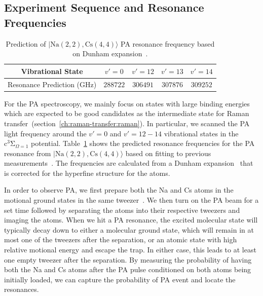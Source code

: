 \subsection{Experiment Sequence and Resonance Frequencies}
\label{ch:pa:sequence-res}

\begin{table}
  \centering
  \caption[PA resonance prediction]{
    Prediction of $|\mathrm{Na(2, 2),Cs(4, 4)}\rangle$ PA resonance frequency
    based on Dunham expansion~\cite{grochola_spin-forbidden_2011,dunham_energy_1932}.
    \label{table:pa:theory-prediction}}
  \begin{tabular}{|c|c|c|c|c|}
    \hline
    Vibrational State&$v'=0$&$v'=12$&$v'=13$&$v'=14$\\\hline
    Resonance Prediction (GHz)&$288722$&$306491$&$307876$&$309252$\\\hline
  \end{tabular}
\end{table}

For the PA spectroscopy, we mainly focus on states with large binding energies
which are expected to be good candidates as the intermediate state
for Raman transfer~(section~\ref{ch:raman-transfer:raman}).
In particular, we scanned the PA light frequency around the $v'=0$ and $v'=12-14$
vibrational states in the $\mathrm{c^3\Sigma}_{\Omega=1}$ potential.
Table~\ref{table:pa:theory-prediction} shows the predicted resonance frequencies
for the PA resonance from $|\mathrm{Na(2, 2),Cs(4, 4)}\rangle$
based on fitting to previous measurements~\cite{grochola_spin-forbidden_2011}.
The frequencies are calculated from a Dunham expansion~\cite{dunham_energy_1932}
that is corrected for the hyperfine structure for the atoms.

In order to observe PA, we first prepare both the Na and Cs atoms in the motional ground states
in the same tweezer~\cite{liu_building_2018}.
We then turn on the PA beam for a set time
followed by separating the atoms into their respective tweezers and imaging the atoms.
When we hit a PA resonance, the excited molecular state will typically decay down
to either a molecular ground state,
which will remain in at most one of the tweezers after the separation,
or an atomic state with high relative motional energy and escape the trap.
In either case, this leads to at least one empty tweezer after the separation.
By measuring the probability of having both the Na and Cs atoms after the PA pulse
conditioned on both atoms being initially loaded,
we can capture the probability of PA event and locate the resonances.

